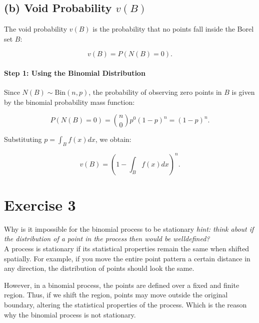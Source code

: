 \documentclass{article}
\begin{document}
\subsection*{(b) Void Probability $v(B)$}

The void probability $v(B)$ is the probability that no points fall inside the Borel set $B$:

\[
    v(B) = P(N(B) = 0).
\]

\paragraph{Step 1: Using the Binomial Distribution}
Since $N(B) \sim \text{Bin}(n, p)$, the probability of observing zero points in $B$ is given by the binomial probability mass function:

\[
    P(N(B) = 0) = \binom{n}{0} p^0 (1 - p)^n = (1 - p)^n.
\]

Substituting $p = \int_B f(x) dx$, we obtain:

\[
    v(B) = \left( 1 - \int_B f(x) dx \right)^n.
\]

\section*{Exercise 3}
Why is it impossible for the binomial process to be stationary \textit{hint: think
about if the distribution of a point in the process then would be welldefined?}\\

A process is stationary if its statistical properties remain the same when shifted spatially. 
For example, if you move the entire point pattern a certain distance in any direction, 
the distribution of points should look the same.

However, in a binomial process, the points are defined over a fixed and finite region. 
Thus, if we shift the region, points may move outside the original boundary, altering the statistical properties of the process. 
Which is the reason why the binomial process is not stationary.
\end{document}
